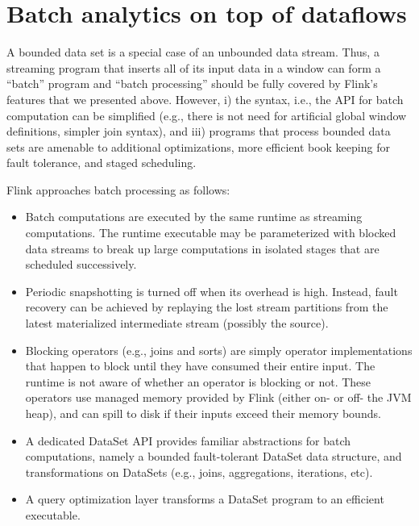 
\section{Batch analytics on top of dataflows}
\label{sec:batch}

A bounded data set is a special case of an unbounded data stream. Thus, a streaming program that inserts all of its input data in a window can form a “batch” program and “batch processing” should be fully covered by Flink’s features that we presented above. However, i) the syntax, i.e., the API for batch computation can be simplified (e.g., there is not need for artificial global window definitions, simpler join syntax), and iii) programs that process bounded data sets are amenable to additional optimizations, more efficient book keeping for fault tolerance, and staged scheduling.

\vspace{2mm}
\noindent Flink approaches batch processing as follows:\vspace{-3mm}
\begin{itemize}
	\item Batch computations are executed by the same runtime as streaming computations. The runtime executable may be parameterized with blocked data streams to break up large computations in isolated stages that are scheduled successively. \vspace{-3mm}
	\item Periodic snapshotting is turned off when its overhead is high. Instead, fault recovery can be achieved by replaying the lost stream partitions from the latest materialized intermediate stream (possibly the source).\vspace{-3mm}
	\item Blocking operators (e.g., joins and sorts) are simply operator implementations that happen to block until they have consumed their entire input. The runtime is not aware of whether an operator is blocking or not. These operators use managed memory provided by Flink (either on- or off- the JVM heap), and can spill to disk if their inputs exceed their memory bounds.\vspace{-3mm}
	\item A dedicated DataSet API provides familiar abstractions for batch computations, namely a bounded fault-tolerant DataSet data structure, and transformations on DataSets (e.g., joins, aggregations, iterations, etc).\vspace{-3mm}
	\item A query optimization layer transforms a DataSet program to an efficient executable.\vspace{-3mm}
\end{itemize}

